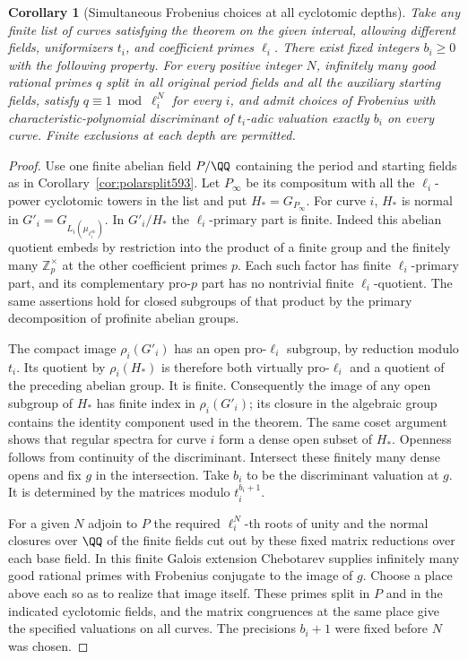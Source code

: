 \documentclass[a4paper,11pt]{article}
\newtheorem{corollary}[proposition]{Corollary}
\theoremstyle{definition}
\theoremstyle{remark}
\newcommand{\ZZ}{\mathbb Z}\newcommand{\ord}{\operatorname{ord}}
\numberwithin{equation}{section}
\begin{document}
\begin{corollary}[Simultaneous Frobenius choices at all cyclotomic depths]
\leavevmode\label{cor:commoncurves597}
Take any finite list of curves satisfying the theorem on
the given interval, allowing different fields, uniformizers
\(t_i\), and coefficient primes \(\ell_i\). There exist
fixed integers \(b_i\ge0\) with the following property.
For every positive integer \(N\), infinitely many good
rational primes \(q\) split in all original period fields
and all the auxiliary starting fields, satisfy
\(q\equiv1\bmod\ell_i^N\) for every \(i\), and admit choices
of Frobenius with characteristic-polynomial discriminant
of \(t_i\)-adic valuation exactly \(b_i\) on every curve.
Finite exclusions at each depth are permitted.
\end{corollary}
\begin{proof}
Use one finite abelian field \(P/\QQ\) containing the
period and starting fields as in
Corollary~\ref{cor:polarsplit593}. Let \(P_\infty\)
be its compositum with all the \(\ell_i\)-power cyclotomic
towers in the list and put \(H_* = G_{P_\infty}\).
For curve \(i\), \(H_*\) is normal in
\(G'_i=G_{L_i(\mu_{\ell_i^\infty})}\). In
\(G'_i/H_*\) the \(\ell_i\)-primary part is finite.
Indeed this abelian quotient embeds by restriction into
the product of a finite group and the finitely many
\(\ZZ_p^\times\) at the other coefficient primes \(p\).
Each such factor has finite \(\ell_i\)-primary part,
and its complementary pro-\(p\) part has no nontrivial
finite \(\ell_i\)-quotient. The same assertions hold for
closed subgroups of that product by the primary
decomposition of profinite abelian groups.

The compact image \(\rho_i(G'_i)\) has an open pro-\(\ell_i\)
subgroup, by reduction modulo \(t_i\). Its quotient by
\(\rho_i(H_*)\) is therefore both virtually pro-\(\ell_i\)
and a quotient of the preceding abelian group. It is
finite. Consequently the image of any open subgroup of
\(H_*\) has finite index in \(\rho_i(G'_i)\); its closure
in the algebraic group contains the identity component
used in the theorem. The same coset argument shows that
regular spectra for curve \(i\) form a dense open subset
of \(H_*\). Openness follows from continuity of the
discriminant. Intersect these finitely many dense opens
and fix \(g\) in the intersection. Take \(b_i\) to be
the discriminant valuation at \(g\). It is determined
by the matrices modulo \(t_i^{b_i+1}\).

For a given \(N\) adjoin to \(P\) the required
\(\ell_i^N\)-th roots of unity and the normal closures
over \(\QQ\) of the finite fields cut out by these fixed
matrix reductions over each base field. In this finite
Galois extension Chebotarev supplies infinitely many
good rational primes with Frobenius conjugate to the
image of \(g\). Choose a place above each so as to
realize that image itself. These primes split in \(P\)
and in the indicated cyclotomic fields, and the matrix
congruences at the same place give the specified
valuations on all curves. The precisions \(b_i+1\) were
fixed before \(N\) was chosen.
\end{proof}
\end{document}
